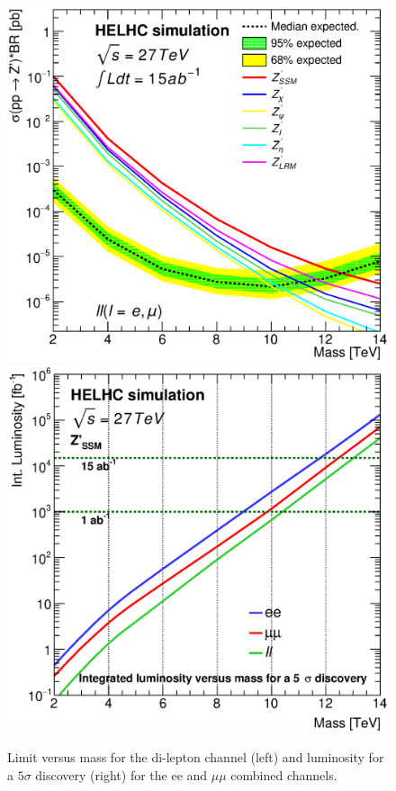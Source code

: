 \begin{figure}[!htb]
  \centering
  \includegraphics[width=0.45\columnwidth]{Fig/27tev/lim_Zprime_ll_helhc_v01_allxs.eps}
  \includegraphics[width=0.45\columnwidth]{Fig/27tev/DiscoveryPotential_ll_comb_rootStyle.eps}
  \caption{Limit versus mass for the di-lepton channel (left) and luminosity for a $5\sigma$ discovery (right) for the ee and $\mu\mu$ combined channels. }
  \label{figure:lepana:limdisc}
\end{figure}


\label{subsubsection:vardef}

